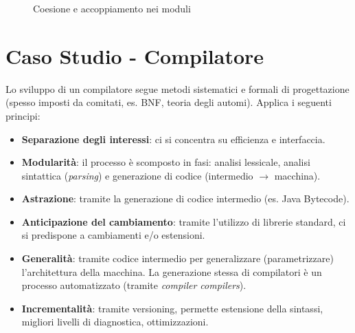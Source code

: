\begin{figure}[H]
  \centering
  \hfill
  \caption{Coesione e accoppiamento nei moduli}
\end{figure}

\section{Caso Studio - Compilatore}

Lo sviluppo di un compilatore segue metodi sistematici e formali di progettazione (spesso imposti da comitati, es. BNF, teoria degli automi). Applica i seguenti principi:
\begin{itemize}
    \item \textbf{Separazione degli interessi}: ci si concentra su efficienza e interfaccia.
    \item \textbf{Modularità}: il processo è scomposto in fasi: analisi lessicale, analisi sintattica (\textit{parsing}) e generazione di codice (intermedio $\rightarrow$ macchina).
    \item \textbf{Astrazione}: tramite la generazione di codice intermedio (es. Java Bytecode).
    \item \textbf{Anticipazione del cambiamento}: tramite l'utilizzo di librerie standard, ci si predispone a cambiamenti e/o estensioni.
    \item \textbf{Generalità}: tramite codice intermedio per generalizzare (parametrizzare) l'architettura della macchina. La generazione stessa di compilatori è un processo automatizzato (tramite \textit{compiler compilers}).
    \item \textbf{Incrementalità}: tramite versioning, permette estensione della sintassi, migliori livelli di diagnostica, ottimizzazioni.
\end{itemize}

